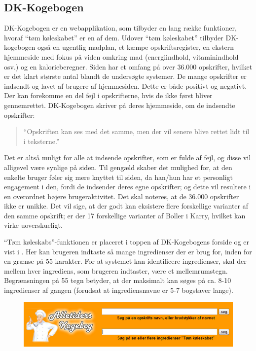 \subsection{DK-Kogebogen}
\label{subsec:dk-kogebogen}

DK-Kogebogen er en webapplikation, som tilbyder en lang række funktioner, hvoraf ``tøm køleskabet'' er en af dem. Udover ``tøm køleskabet'' tilbyder DK-kogebogen også en ugentlig madplan, et kæmpe opskriftsregister, en ekstern hjemmeside med fokus på viden omkring mad (energiindhold, vitaminindhold osv.) og en kalorieberegner. Siden har et omfang på over 36.000 opskrifter, hvilket er det klart største antal blandt de undersøgte systemer. De mange opskrifter er indsendt og lavet af brugere af hjemmesiden. Dette er både positivt og negativt. Der kan forekomme en del fejl i opskrifterne, hvis de ikke først bliver gennemrettet. DK-Kogebogen skriver på deres hjemmeside, om de indsendte opskrifter:

\begin{quote}
``Opskriften kan ses med det samme, men der vil senere blive rettet lidt til i teksterne.'' \cite{dk-kog-indtastopskrift}
\end{quote}

Det er altså muligt for alle at indsende opskrifter, som er fulde af fejl, og disse vil alligevel være synlige på siden. Til gengæld skaber det mulighed for, at den enkelte bruger føler sig mere knyttet til siden, da han/hun har et personligt engagement i den, fordi de indsender deres egne opskrifter; og dette vil resultere i en overordnet højere brugeraktivitet. Det skal noteres, at de 36.000 opskrifter ikke er unikke. Det vil sige, at der godt kan eksistere flere forskellige varianter af den samme opskrift; \fx er der 17 forskellige varianter af Boller i Karry, hvilket kan virke uoverskueligt.

``Tøm køleskabs''-funktionen er placeret i toppen af DK-Kogebogens forside og er vist i . Her kan brugeren indtaste så mange ingredienser der er brug for, inden for en grænse på 55 karakter. For at systemet kan identificere ingredienser, skal der mellem hver ingrediens, som brugeren indtaster, være et mellemrumstegn. Begrænsningen på 55 tegn betyder, at der maksimalt kan søges på ca. 8-10 ingredienser af gangen (forudsat at ingrediensnavne er 5-7 bogstaver lange).

\begin{figure}[H]
\centering
\includegraphics[scale=0.7]{billeder/forbilleder/dk-kogebogen.png}
\label{fig:dk-kogebogen1}
\end{figure}

